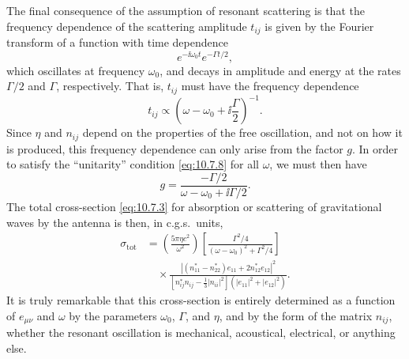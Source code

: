 The final consequence of the assumption of resonant scattering is that the
frequency dependence of the scattering amplitude \(t_{ij}\) is given by the
Fourier transform of a function with time dependence
\[
  e^{-\ii\omega_0t}e^{-\Gamma t/2},
\]
which oscillates at frequency \(\omega_0\), and decays in amplitude and energy
at the rates \(\Gamma/2\) and \(\Gamma\), respectively. That is,
\(t_{ij}\) must have the frequency dependence
\begin{equation}
  t_{ij}\propto
  \left(\omega-\omega_0+\ii\frac{\Gamma}{2}\right)^{-1}.
  \tag{10.7.10}\label{eq:10.7.10}
\end{equation}
Since \(\eta\) and \(n_{ij}\) depend on the properties of the free oscillation,
and not on how it is produced, this frequency dependence can only arise from
the factor \(g\). In order to satisfy the ``unitarity'' condition
\eqref{eq:10.7.8} for all \(\omega\), we must then have
\begin{equation}
  g
  =
  \frac{-\Gamma/2}{\omega-\omega_0+\ii\Gamma/2}.
  \tag{10.7.11}\label{eq:10.7.11}
\end{equation}
The total cross-section \eqref{eq:10.7.3} for absorption or scattering of
gravitational waves by the antenna is then, in c.g.s.\ units,
\begin{equation}
  \begin{split}
  \sigma_{\mathrm{tot}}
  &=
  \left(\frac{5\pi\eta c^2}{\omega^2}\right)
  \left[
    \frac{\Gamma^2/4}
    {(\omega-\omega_0)^2+\Gamma^2/4}
  \right]
  \\
  &\quad\times
  \frac{
    \left|
      (n_{11}^*-n_{22}^*)e_{11}+2n_{12}^*e_{12}
    \right|^2
  }{
    \left[
      n_{ij}^*n_{ij}-\frac13\lvert n_{ii}\rvert^2
    \right]
    \left(
      \lvert e_{11}\rvert^2+\lvert e_{12}\rvert^2
    \right)
  }.
  \end{split}
  \tag{10.7.12}\label{eq:10.7.12}
\end{equation}
It is truly remarkable that this cross-section is entirely determined as a
function of \(e_{\mu\nu}\) and \(\omega\) by the parameters \(\omega_0\),
\(\Gamma\), and \(\eta\), and by the form of the matrix \(n_{ij}\), whether
the resonant oscillation is mechanical, acoustical, electrical, or anything
else.

